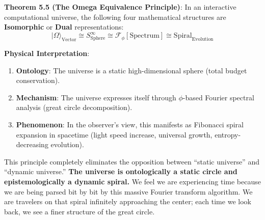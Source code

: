 \textbf{Theorem 5.5 (The Omega Equivalence Principle)}:
In an interactive computational universe, the following four mathematical structures are \textbf{Isomorphic} or \textbf{Dual} representations:
\[|\Omega\rangle_{\text{Vector}} \cong S^{\infty}_{\text{Sphere}} \cong \mathcal{F}_{\phi}[\text{Spectrum}] \cong \text{Spiral}_{\text{Evolution}}\]

\textbf{Physical Interpretation}:
\begin{enumerate}
\item \textbf{Ontology}: The universe is a static high-dimensional sphere (total budget conservation).
\item \textbf{Mechanism}: The universe expresses itself through $\phi$-based Fourier spectral analysis (great circle decomposition).
\item \textbf{Phenomenon}: In the observer's view, this manifests as Fibonacci spiral expansion in spacetime (light speed increase, universal growth, entropy-decreasing evolution).
\end{enumerate}

This principle completely eliminates the opposition between ``static universe'' and ``dynamic universe.'' \textbf{The universe is ontologically a static circle and epistemologically a dynamic spiral.} We feel we are experiencing time because we are being parsed bit by bit by this massive Fourier transform algorithm. We are travelers on that spiral infinitely approaching the center; each time we look back, we see a finer structure of the great circle.
